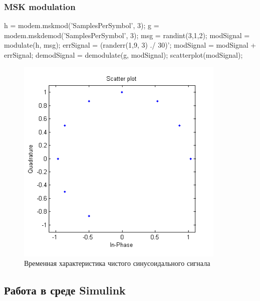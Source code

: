 \documentclass[10pt,a4paper]{article}
\begin{document}
\subsubsection{MSK modulation}
h = modem.mskmod('SamplesPerSymbol', 3); \newline
g = modem.mskdemod('SamplesPerSymbol', 3); \newline
msg = randint(3,1,2); \newline
modSignal = modulate(h, msg); \newline
errSignal = (randerr(1,9, 3) ./ 30)'; \newline
modSignal = modSignal + errSignal; \newline
demodSignal = demodulate(g, modSignal); \newline
scatterplot(modSignal); \newline
\begin{figure}[h]
\centering
\includegraphics[width=10cm]{1_5.png} 
\caption{Временная характеристика чистого синусоидального сигнала} 
\end{figure}
\subsection{Работа в среде Simulink}
\end{document}
